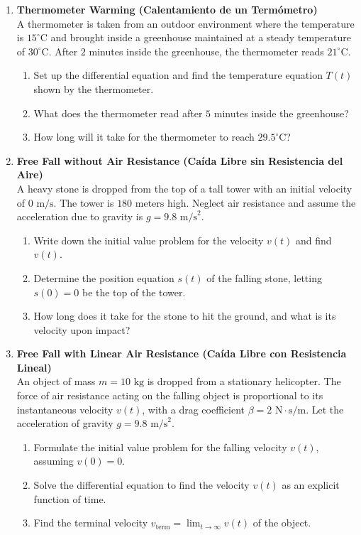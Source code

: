 \documentclass[11pt,letterpaper]{article}
\begin{document}
\begin{enumerate}[label=\textbf{Problem \arabic*:}, leftmargin=*]
    \item \textbf{Thermometer Warming (Calentamiento de un Termómetro)} \\
    A thermometer is taken from an outdoor environment where the temperature is $15^\circ\text{C}$ and brought inside a greenhouse maintained at a steady temperature of $30^\circ\text{C}$. After $2$ minutes inside the greenhouse, the thermometer reads $21^\circ\text{C}$.
    \begin{enumerate}[label=(\alph*)]
        \item Set up the differential equation and find the temperature equation $T(t)$ shown by the thermometer.
        \item What does the thermometer read after $5$ minutes inside the greenhouse?
        \item How long will it take for the thermometer to reach $29.5^\circ\text{C}$?
    \end{enumerate}

    \item \textbf{Free Fall without Air Resistance (Caída Libre sin Resistencia del Aire)} \\
    A heavy stone is dropped from the top of a tall tower with an initial velocity of $0\text{ m/s}$. The tower is $180\text{ meters}$ high. Neglect air resistance and assume the acceleration due to gravity is $g = 9.8\text{ m/s}^2$.
    \begin{enumerate}[label=(\alph*)]
        \item Write down the initial value problem for the velocity $v(t)$ and find $v(t)$.
        \item Determine the position equation $s(t)$ of the falling stone, letting $s(0) = 0$ be the top of the tower.
        \item How long does it take for the stone to hit the ground, and what is its velocity upon impact?
    \end{enumerate}

    \item \textbf{Free Fall with Linear Air Resistance (Caída Libre con Resistencia Lineal)} \\
    An object of mass $m = 10\text{ kg}$ is dropped from a stationary helicopter. The force of air resistance acting on the falling object is proportional to its instantaneous velocity $v(t)$, with a drag coefficient $\beta = 2\text{ N}\cdot\text{s/m}$. Let the acceleration of gravity $g = 9.8\text{ m/s}^2$.
    \begin{enumerate}[label=(\alph*)]
        \item Formulate the initial value problem for the falling velocity $v(t)$, assuming $v(0) = 0$.
        \item Solve the differential equation to find the velocity $v(t)$ as an explicit function of time.
        \item Find the terminal velocity $v_{\text{term}} = \lim_{t \to \infty} v(t)$ of the object.
    \end{enumerate}


\end{enumerate}
\end{document}
